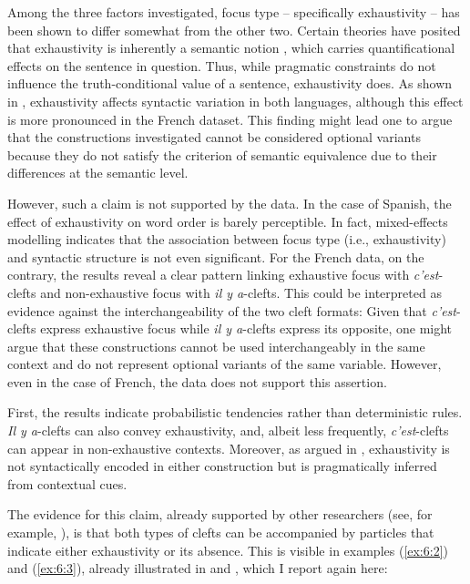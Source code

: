 Among the three factors investigated, focus type -- specifically exhaustivity -- has been shown to differ somewhat from the other two. Certain theories have posited that exhaustivity is inherently a semantic notion \parencite{szabolcsi1981semantics, kiss1998identificational}, which carries quantificational effects on the sentence in question. Thus, while pragmatic constraints do not influence the truth-conditional value of a sentence, exhaustivity does. As shown in , exhaustivity affects syntactic variation in both languages, although this effect is more pronounced in the French dataset. This finding might lead one to argue that the constructions investigated cannot be considered optional variants because they do not satisfy the criterion of semantic equivalence due to their differences at the semantic level.

However, such a claim is not supported by the data. In the case of Spanish, the effect of exhaustivity on word order is barely perceptible. 
In fact, mixed-effects modelling indicates that the association between focus type (i.e., exhaustivity) and syntactic structure is not even significant. For the French data, on the contrary, the results reveal a clear pattern linking exhaustive focus with \textit{c'est}-clefts and non-exhaustive focus with \textit{il y a}-clefts. This could be interpreted as evidence against the interchangeability of the two cleft formats: Given that \textit{c'est}-clefts express exhaustive focus while \textit{il y a}-clefts express its opposite, one might argue that these constructions cannot be used interchangeably in the same context and do not represent optional variants of the same variable. However, even in the case of French, the data does not support this assertion.

First, the results indicate probabilistic tendencies rather than deterministic rules. \textit{Il y a}-clefts can also convey exhaustivity, and, albeit less frequently, \textit{c'est}-clefts can appear in non-exhaustive contexts. Moreover, as argued in , exhaustivity is not syntactically encoded in either construction but is pragmatically inferred from contextual cues. 

The evidence for this claim, already supported by other researchers (see, for example, \cite{horn1981exhaustiveness, dufter2009clefting, destruel2018interpretation}), is that both types of clefts can be accompanied by particles that indicate either exhaustivity or its absence. This is visible in examples (\ref{ex:6:2}) and (\ref{ex:6:3}), already illustrated in  and , which I report again here:

